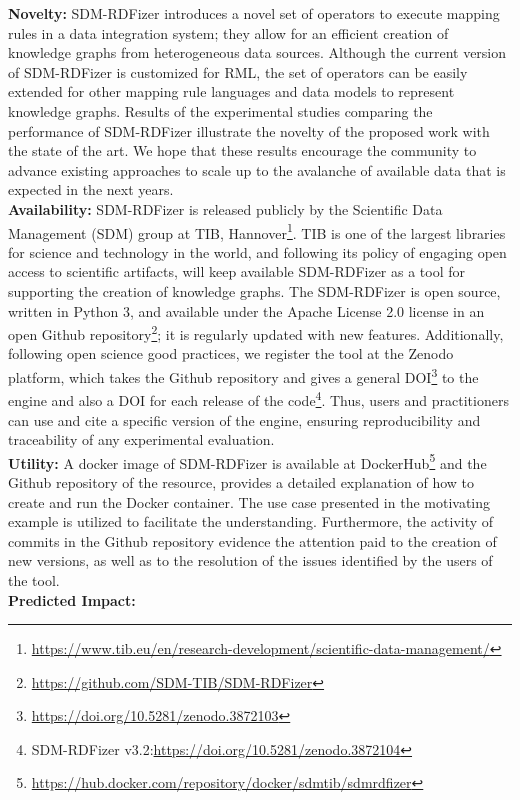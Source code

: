 \textbf{Novelty:}
SDM-RDFizer introduces a novel set of operators to execute mapping rules in a data integration system; they allow for an efficient creation of knowledge graphs from heterogeneous data sources. Although the current version of SDM-RDFizer is customized for RML, the set of operators can be easily extended for other mapping rule languages and data models to represent knowledge graphs. Results of the experimental studies comparing the performance of SDM-RDFizer illustrate the novelty of the proposed work with the state of the art. We hope that these results encourage the community to advance existing approaches to scale up to the avalanche of available data that is expected in the next years.
\\
\textbf{Availability:}
SDM-RDFizer is released publicly by the Scientific Data Management (SDM) group at TIB, Hannover\footnote{\url{https://www.tib.eu/en/research-development/scientific-data-management/}}. 
TIB is one of the largest libraries for science and technology in the world, and following its policy of engaging open access to scientific artifacts, will keep available SDM-RDFizer as a tool for supporting the creation of knowledge graphs.  
The SDM-RDFizer is open source, written in Python 3, and available under the Apache License 2.0 license in an open Github repository\footnote{\url{https://github.com/SDM-TIB/SDM-RDFizer}}; it is regularly updated with new features. 
Additionally, following open science good practices, we register the tool at the Zenodo platform, which takes the Github repository and gives a general DOI\footnote{\url{https://doi.org/10.5281/zenodo.3872103}} to the engine and also a DOI for each release of the code\footnote{SDM-RDFizer v3.2:\url{https://doi.org/10.5281/zenodo.3872104}}. 
Thus, users and practitioners can use and cite a specific version of the engine, ensuring reproducibility and traceability of any experimental evaluation.
\\
\textbf{Utility:}
A docker image of SDM-RDFizer is available at DockerHub\footnote{\url{https://hub.docker.com/repository/docker/sdmtib/sdmrdfizer}} and the Github repository of the resource, provides a detailed explanation of how to create and run the Docker container. The use case presented in the motivating example is utilized to facilitate the understanding. Furthermore, the activity of commits in the Github repository evidence the attention paid to the creation of new versions, as well as to the resolution of the issues identified by the users of the tool.   
\\
\textbf{Predicted Impact:}
